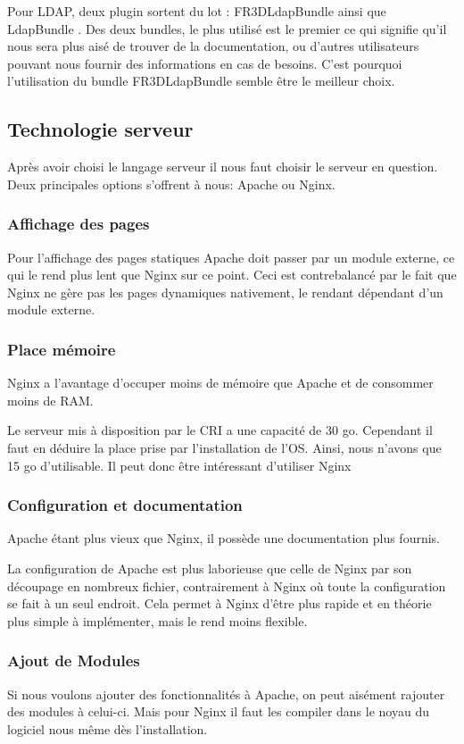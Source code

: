Pour LDAP, deux plugin sortent du lot : \og FR3DLdapBundle \fg ainsi que \og LdapBundle \fg. Des deux bundles, le plus utilisé est le premier ce qui signifie qu'il nous sera plus aisé de trouver de la documentation, ou d’autres utilisateurs pouvant nous fournir des informations en cas de besoins. C'est pourquoi l'utilisation du bundle \og FR3DLdapBundle \fg semble être le meilleur choix.

\subsection{Technologie serveur}

Après avoir choisi le langage serveur il nous faut choisir le serveur en question. Deux principales options s'offrent à nous: Apache ou Nginx.

\subsubsection{Affichage des pages}
Pour l'affichage des pages statiques Apache doit passer par un module externe, ce qui le rend plus lent que Nginx sur ce point.
Ceci est contrebalancé par le fait que Nginx ne gère pas les pages dynamiques nativement, le rendant dépendant d'un module externe.

\subsubsection{Place mémoire}
Nginx a l'avantage d'occuper moins de mémoire que Apache et de consommer moins de RAM.

Le serveur mis à disposition par le CRI a une capacité de 30 go. Cependant il faut en déduire  la place prise par l'installation de l'OS. Ainsi, nous n'avons que 15 go d'utilisable. Il peut donc être intéressant d'utiliser Nginx
\subsubsection{Configuration et documentation}
Apache étant plus vieux que Nginx, il possède une documentation plus fournis.

La configuration de Apache est plus laborieuse que celle de Nginx par son découpage en nombreux fichier, contrairement à Nginx où toute la configuration se fait à un seul endroit.
Cela permet à Nginx d'être plus rapide et en théorie plus simple à implémenter, mais le rend moins flexible.

\subsubsection{Ajout de Modules}
Si nous voulons ajouter des fonctionnalités à Apache, on peut aisément rajouter des modules à celui-ci. Mais pour Nginx il faut les compiler dans le noyau du logiciel nous même dès l'installation.

